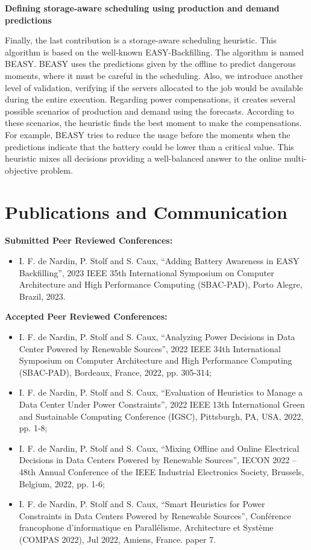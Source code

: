 \begin{center}
    \textbf{Defining storage-aware scheduling using production and demand predictions}
\end{center}

Finally, the last contribution is a storage-aware scheduling heuristic. This algorithm is based on the well-known EASY-Backfilling. The algorithm is named BEASY. BEASY uses the predictions given by the offline to predict dangerous moments, where it must be careful in the scheduling. Also, we introduce another level of validation, verifying if the servers allocated to the job would be available during the entire execution. Regarding power compensations, it creates several possible scenarios of production and demand using the forecasts. According to these scenarios, the heuristic finds the best moment to make the compensations. For example, BEASY tries to reduce the usage before the moments when the predictions indicate that the battery could be lower than a critical value. This heuristic mixes all decisions providing a well-balanced answer to the online multi-objective problem.

\section{Publications and Communication}

\hspace{0.5cm} \textbf{Submitted Peer Reviewed Conferences:}
\begin{itemize}
    \item I. F. de Nardin, P. Stolf and S. Caux, ``Adding Battery Awareness in EASY Backfilling'', 2023 IEEE 35th International Symposium on Computer Architecture and High Performance Computing (SBAC-PAD), Porto Alegre, Brazil, 2023.
\end{itemize}

\textbf{Accepted Peer Reviewed Conferences:}
\begin{itemize}
    \item I. F. de Nardin, P. Stolf and S. Caux, ``Analyzing Power Decisions in Data Center Powered by Renewable Sources'', 2022 IEEE 34th International Symposium on Computer Architecture and High Performance Computing (SBAC-PAD), Bordeaux, France, 2022, pp. 305-314;
    \item I. F. de Nardin, P. Stolf and S. Caux, ``Evaluation of Heuristics to Manage a Data Center Under Power Constraints'', 2022 IEEE 13th International Green and Sustainable Computing Conference (IGSC), Pittsburgh, PA, USA, 2022, pp. 1-8;
    \item I. F. de Nardin, P. Stolf and S. Caux, ``Mixing Offline and Online Electrical Decisions in Data Centers Powered by Renewable Sources'', IECON 2022 – 48th Annual Conference of the IEEE Industrial Electronics Society, Brussels, Belgium, 2022, pp. 1-6;
    \item  I. F. de Nardin, P. Stolf and S. Caux, ``Smart Heuristics for Power Constraints in Data Centers Powered by Renewable Sources'', Conférence francophone d'informatique en Parallélisme, Architecture et Système (COMPAS 2022), Jul 2022, Amiens, France. paper 7.
\end{itemize}

